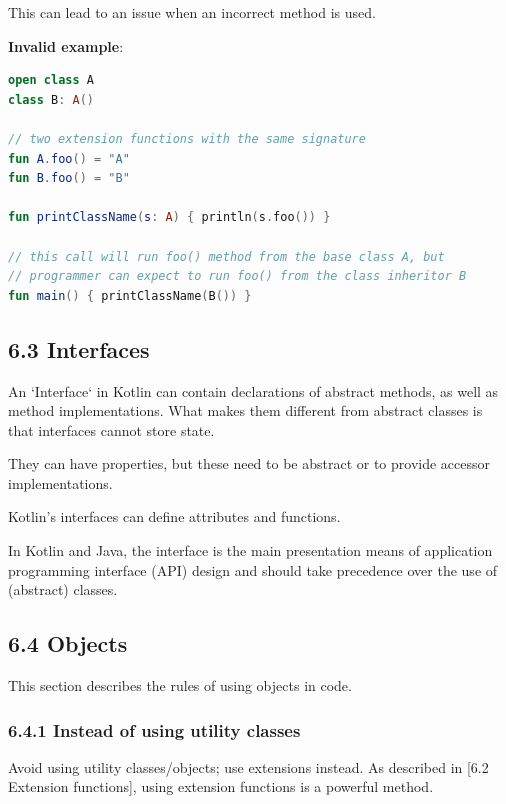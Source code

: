{{{{This can lead to an issue when an incorrect method is used.



\textbf{Invalid example}:

\begin{lstlisting}[language=Kotlin]
open class A
class B: A()

// two extension functions with the same signature
fun A.foo() = "A"
fun B.foo() = "B"

fun printClassName(s: A) { println(s.foo()) }

// this call will run foo() method from the base class A, but
// programmer can expect to run foo() from the class inheritor B
fun main() { printClassName(B()) }
\end{lstlisting}


\subsection*{\textbf{6.3 Interfaces}}

An `Interface` in Kotlin can contain declarations of abstract methods, as well as method implementations. What makes them different from abstract classes is that interfaces cannot store state.

They can have properties, but these need to be abstract or to provide accessor implementations.



Kotlin's interfaces can define attributes and functions.

In Kotlin and Java, the interface is the main presentation means of application programming interface (API) design and should take precedence over the use of (abstract) classes.



\subsection*{\textbf{6.4 Objects}}

This section describes the rules of using objects in code.

\subsubsection*{\textbf{6.4.1 Instead of using utility classes}}
\leavevmode\newline

Avoid using utility classes/objects; use extensions instead. As described in [6.2 Extension functions], using extension functions is a powerful method.

}}}}
